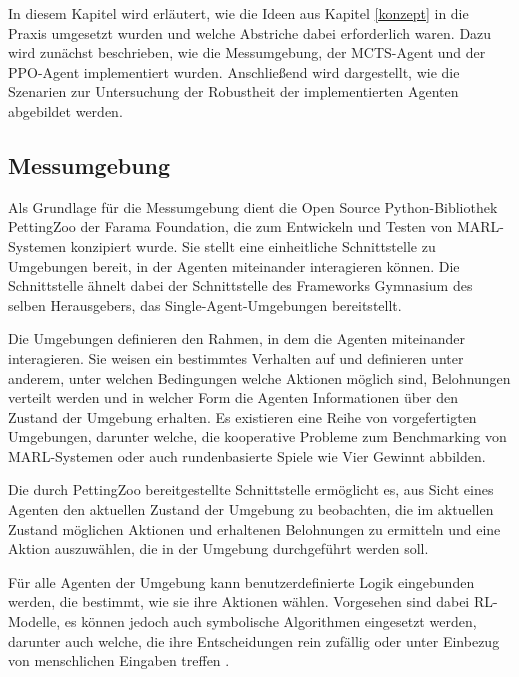 In diesem Kapitel wird erläutert, wie die Ideen aus Kapitel \ref{konzept} in die Praxis umgesetzt wurden und welche Abstriche dabei erforderlich waren. Dazu wird zunächst beschrieben, wie die Messumgebung, der MCTS-Agent und der PPO-Agent implementiert wurden. Anschließend wird dargestellt, wie die Szenarien zur Untersuchung der Robustheit der implementierten Agenten abgebildet werden.

\subsection{Messumgebung}

\label{messumgebung}


Als Grundlage für die Messumgebung dient die Open Source Python-Bibliothek PettingZoo der Farama Foundation, die zum Entwickeln und Testen von MARL-Systemen konzipiert wurde. Sie stellt eine einheitliche Schnittstelle zu Umgebungen bereit, in der Agenten miteinander interagieren können. Die Schnittstelle ähnelt dabei der Schnittstelle des Frameworks Gymnasium des selben Herausgebers, das Single-Agent-Umgebungen bereitstellt.

Die Umgebungen definieren den Rahmen, in dem die Agenten miteinander interagieren. Sie weisen ein bestimmtes Verhalten auf und definieren unter anderem, unter welchen Bedingungen welche Aktionen möglich sind, Belohnungen verteilt werden und in welcher Form die Agenten Informationen über den Zustand der Umgebung erhalten. Es existieren eine Reihe von vorgefertigten Umgebungen, darunter welche, die kooperative Probleme zum Benchmarking von MARL-Systemen oder auch rundenbasierte Spiele wie Vier Gewinnt abbilden.

Die durch PettingZoo bereitgestellte Schnittstelle ermöglicht es, aus Sicht eines Agenten den aktuellen Zustand der Umgebung zu beobachten, die im aktuellen Zustand möglichen Aktionen und erhaltenen Belohnungen zu ermitteln und eine Aktion auszuwählen, die in der Umgebung durchgeführt werden soll.

Für alle Agenten der Umgebung kann benutzerdefinierte Logik eingebunden werden, die bestimmt, wie sie ihre Aktionen wählen. Vorgesehen sind dabei RL-Modelle, es können jedoch auch symbolische Algorithmen eingesetzt werden, darunter auch welche, die ihre Entscheidungen rein zufällig oder unter Einbezug von menschlichen Eingaben treffen \cite{Farama.2025}.


